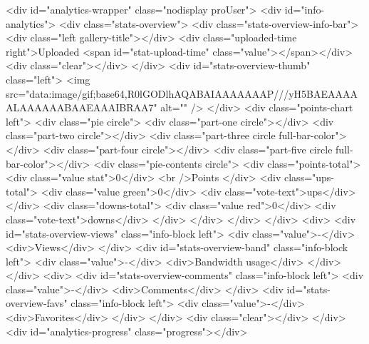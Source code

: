     <div id="analytics-wrapper" class="nodisplay proUser">
    <div id="info-analytics">
        <div class="stats-overview">
            <div class="stats-overview-info-bar">
                <div class="left gallery-title"></div>
                <div class="uploaded-time right">Uploaded <span id="stat-upload-time" class="value"></span></div>
                <div class="clear"></div>
            </div>
            <div id="stats-overview-thumb" class="left">
                <img src="data:image/gif;base64,R0lGODlhAQABAIAAAAAAAP///yH5BAEAAAAALAAAAAABAAEAAAIBRAA7" alt="" />
            </div>
            <div class="points-chart left">
                <div class="pie circle">
                    <div class="part-one circle"></div>
                    <div class="part-two circle"></div>
                    <div class="part-three circle full-bar-color"></div>
                    <div class="part-four circle"></div>
                    <div class="part-five circle full-bar-color"></div>
                    <div class="pie-contents circle">
                        <div class="points-total">
                            <div class="value stat">0</div>
                            <br />Points
                        </div>
                        <div class="ups-total">
                            <div class="value green">0</div>
                            <div class="vote-text">ups</div>
                        </div>
                        <div class="downs-total">
                            <div class="value red">0</div>
                            <div class="vote-text">downs</div>
                        </div>
                    </div>
                </div>
            </div>
            <div>
                <div id="stats-overview-views" class="info-block left">
                    <div class="value">-</div>
                    <div>Views</div>
                </div>
                <div id="stats-overview-band" class="info-block left">
                    <div class="value">-</div>
                    <div>Bandwidth usage</div>
                </div>
            </div>
            <div>
                <div id="stats-overview-comments" class="info-block left">
                    <div class="value">-</div>
                    <div>Comments</div>
                </div>
                <div id="stats-overview-favs" class="info-block left">
                    <div class="value">-</div>
                    <div>Favorites</div>
                </div>
            </div>
            <div class="clear"></div>
        </div>
        <div id="analytics-progress" class="progress"></div>
